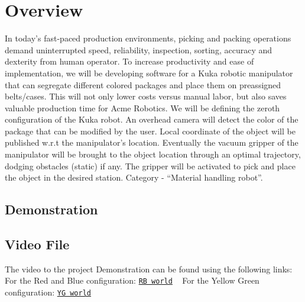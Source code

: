\href{https://travis-ci.org/sbrahma0/segregator}{\tt } \href{https://coveralls.io/github/kamakshijain/segregator?branch=master}{\tt } \subsection*{\href{https://opensource.org/licenses/BSD-3-Clause}{\tt } }

\section*{Overview}

In today’s fast-\/paced production environments, picking and packing operations demand uninterrupted speed, reliability, inspection, sorting, accuracy and dexterity from human operator. To increase productivity and ease of implementation, we will be developing software for a Kuka robotic manipulator that can segregate different colored packages and place them on preassigned belts/cases. This will not only lower costs versus manual labor, but also saves valuable production time for Acme Robotics. We will be defining the zeroth configuration of the Kuka robot. An overhead camera will detect the color of the package that can be modified by the user. Local coordinate of the object will be published w.\+r.\+t the manipulator’s location. Eventually the vacuum gripper of the manipulator will be brought to the object location through an optimal trajectory, dodging obstacles (static) if any. The gripper will be activated to pick and place the object in the desired station. Category -\/ “\+Material handling robot”.

\subsection*{Demonstration}

\subsection*{Video File}

The video to the project Demonstration can be found using the following links\+: ~\newline
 For the Red and Blue configuration\+: \href{https://drive.google.com/open?id=1-ZEGL8EZApvfI70jUEOpr-Fli41xDrfM}{\tt RB world} ~\newline
 For the Yellow Green configuration\+: \href{https://drive.google.com/open?id=1ZiCZVlUQzcZHYuTLBjwb5nXxRo2_XhzU}{\tt YG world}

